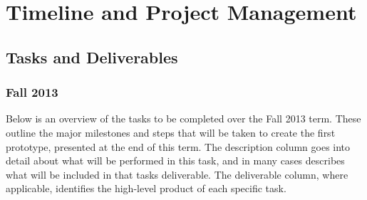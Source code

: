\documentclass{report}
\begin{document}
\newpage
\chapter{Timeline and Project Management}

\section{Tasks and Deliverables}

\subsection{Fall 2013}
Below is an overview of the tasks to be completed over the Fall 2013 term. 
These outline the major milestones and steps that will be taken to create the first prototype, presented at the end of this term. 
The description column goes into detail about what will be performed in this task, and in many cases describes what will be included in that tasks deliverable. 
The deliverable column, where applicable, identifies the high-level product of each specific task.
\\
\end{document}
